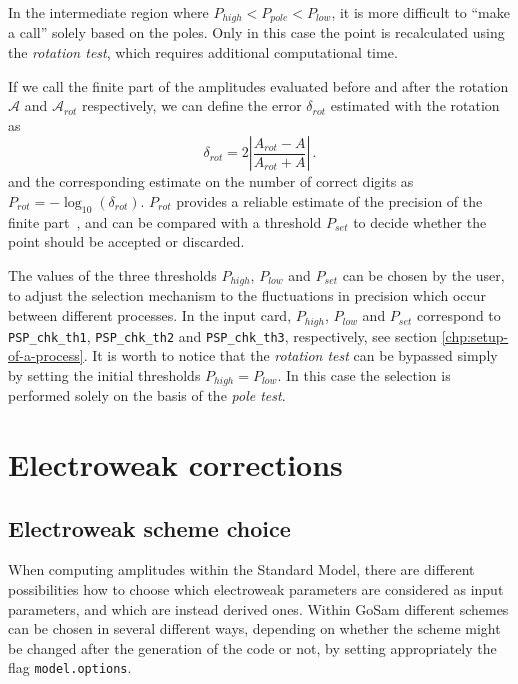 \documentclass[11pt,a4paper]{refrep}
\newcommand{\gosam}{{\sc GoSam}\xspace}
\def\A{\mathcal{A}}
\newcommand{\be}{\begin{equation}}
\newcommand{\ee}{\end{equation}}
\begin{document}
In the intermediate region where $ P_{high} < P_{pole} <  P_{low}$, it is more difficult to ``make a call'' solely based on the poles. Only in this case the point is recalculated using the {\it rotation test}, which requires additional computational time. 

If we call the finite part of the amplitudes evaluated before and after the rotation $\A$ and  $\A_{rot}$ respectively,  we can define the error $ \delta_{rot}$ estimated with the rotation  as  
\be  \label{eq:errd} \delta_{rot} =  2 \left  |\frac{ A_{rot} - A }{ A_{rot} + A} \right  |\, . \ee
and the corresponding estimate on the number of correct digits as $P_{rot} = - \log_{10} (\delta_{rot})$.
$P_{rot}$ provides a reliable estimate of the precision of the finite part~\cite{vanDeurzen:2013saa}, and can be compared with a threshold $P_{set}$ to decide whether the point should be accepted or discarded. 

The values of the three thresholds $ P_{high} $,  $P_{low}$ and $P_{set}$ can be chosen by the user, to adjust the selection mechanism to the fluctuations in precision which occur between different processes. In the input card, $ P_{high} $,  $P_{low}$ and $P_{set}$ correspond to 
\texttt{PSP\_chk\_th1}, \texttt{PSP\_chk\_th2} and \texttt{PSP\_chk\_th3}, 
respectively, see section \ref{chp:setup-of-a-process}.
It is worth to notice that the {\it rotation test} can be bypassed simply by setting the initial thresholds $P_{high}= P_{low}$. In this case the selection is performed solely on the basis of the {\it pole test}.


\chapter{Electroweak corrections}


\section{Electroweak scheme choice}
\label{sec:ewchoose}
When computing amplitudes within the Standard Model, there are different
possibilities how to choose which electroweak parameters are
considered as input parameters, and which are instead derived
ones. Within \gosam{} different schemes can be chosen in several
different ways, depending on whether the scheme might be changed after
the generation of the code or not, by setting appropriately the flag
{\tt model.options}.
\end{document}
